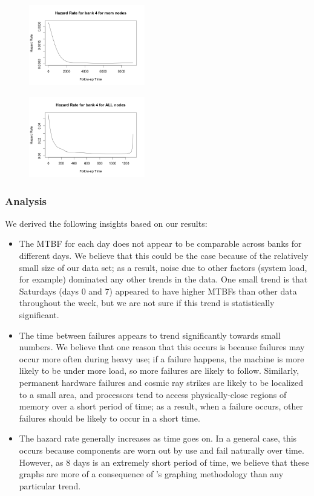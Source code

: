 \begin{figure}
\centering
\includegraphics[width=0.45\textwidth]{images/haz_4_m.png}
\end{figure}

\begin{figure}
\centering
\includegraphics[width=0.45\textwidth]{images/haz_4_a.png}
\end{figure}

\subsubsection{Analysis}

We derived the following insights based on our results:

\begin{itemize}
\item The MTBF for each day does not appear to be comparable across banks for different days.  We believe that this could be the case because of the relatively small size of our data set; as a result, noise due to other factors (system load, for example) dominated any other trends in the data.  One small trend is that Saturdays (days 0 and 7) appeared to have higher MTBFs than other data throughout the week, but we are not sure if this trend is statistically significant.
\item The time between failures appears to trend significantly towards small numbers.  We believe that one reason that this occurs is because failures may occur more often during heavy use; if a failure happens, the machine is more likely to be under more load, so more failures are likely to follow.  Similarly, permanent hardware failures and cosmic ray strikes are likely to be localized to a small area, and processors tend to access physically-close regions of memory over a short period of time; as a result, when a failure occurs, other failures should be likely to occur in a short time.
\item The hazard rate generally increases as time goes on.  In a general case, this occurs because components are worn out by use and fail naturally over time.  However, as 8 days is an extremely short period of time, we believe that these graphs are more of a consequence of 's graphing methodology than any particular trend. 
\end{itemize}
